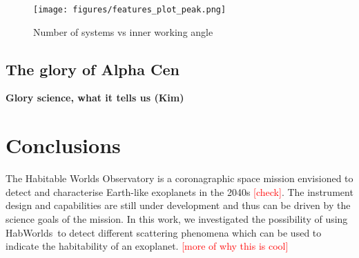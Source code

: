 \documentclass[
    usenatbib,
]{mnras}
\newcommand{\todo}[1]{\textcolor{red}{[#1]}}
\newcommand{\hwo}{HabWorlds}
\begin{document}
\begin{figure*}
    \centering
    \texttt{[image: figures/features\_plot\_peak.png]}  
    \caption{
        Number of systems vs inner working angle
    }
    \label{fig:accessible_phase_angles}
\end{figure*}


\subsection{The glory of Alpha Cen}%
\label{sec:ealpha-cen}
\textbf{Glory science, what it tells us (Kim)}




\section{Conclusions}

The Habitable Worlds Observatory is a coronagraphic space mission envisioned to detect and characterise Earth-like exoplanets in the 2040s \todo{check}. 
%
The instrument design and capabilities are still under development and thus can be driven by the science goals of the mission.
%
In this work, we investigated the possibility of using \hwo\ to detect different scattering phenomena which can be used to indicate the habitability of an exoplanet. \todo{more of why this is cool}
\end{document}

